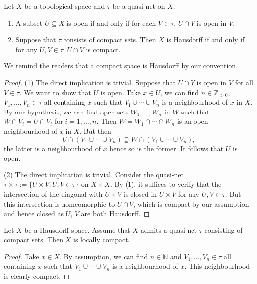 \begin{lemma}\label{lma-quasinetopenset}
    Let $X$ be a topological space and $\tau$ be a quasi-net on $X$. 
    \begin{enumerate}
        \item A subset $U\subseteq X$ is open if and only if for each $V\in \tau$, $U\cap V$ is open in $V$.
        \item Suppose that $\tau$ consists of compact sets. Then $X$ is Hausdorff if and only if for any $U,V\in \tau$, $U\cap V$ is compact.
    \end{enumerate}
\end{lemma}
We remind the readers that a compact space is Hausdorff by our convention.
\begin{proof}
    (1) The direct implication is trivial. Suppose that $U\cap V$ is open in $V$ for all $V\in \tau$. We want to show that $U$ is open. Take $x\in U$, we can find $n\in \mathbb{Z}_{>0}$, $V_1,\ldots,V_n\in \tau$ all containing $x$ such that $V_1\cup \cdots \cup V_n$ is a neighbourhood of $x$ in $X$. By our hypothesis, we can find open sets $W_1,\ldots,W_n$ in $W$ such that $W\cap V_i=U\cap V_i$ for $i=1,\ldots,n$. Then $W=W_1\cap \cdots\cap W_n$ is an open neighbourhood of $x$ in $X$. But then
    \[
        U\cap (V_1\cup\cdots\cup V_n)\supseteq W\cap   (V_1\cup\cdots\cup V_n),
    \]
    the latter is a neighbourhood of $x$ hence so is the former. It follows that $U$ is open.

    (2) The direct implication is trivial. Consider the quasi-net $\tau\times\tau:=\{U\times V: U,V\in \tau\}$ on $X\times X$. 
    By (1), it suffices to verify that the intersection of the diagonal with $U\times V$ is closed in $U\times V$  for any $U,V\in \tau$. But this intersection is homeomorphic to $U\cap V$, which is compact by our assumption and hence closed as $U$, $V$ are both Hausdorff.
\end{proof}

\begin{lemma}\label{lma-quasinetimplyloccpt}
    Let $X$ be a Hausdorff space. Assume that $X$ admits a quasi-net $\tau$ consisting of compact sets. Then $X$ is locally compact.
\end{lemma}
\begin{proof}
    Take $x\in X$. By assumption, we can find $n\in \mathbb{N}$ and $V_1,\ldots,V_n\in \tau$ all containing $x$ such that $V_1\cup\cdots\cup V_n$ is a neighbourhood of $x$. This neighbourhood is clearly compact.
\end{proof}

